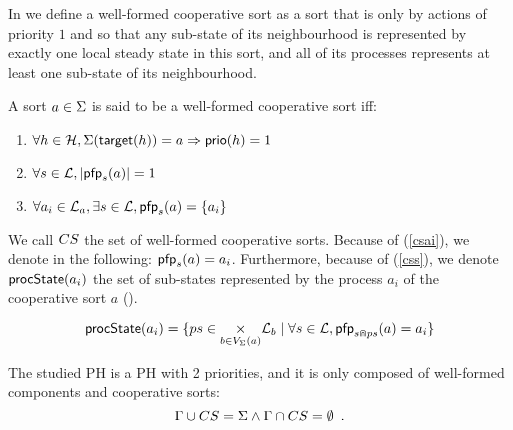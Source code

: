 In  we define a well-formed cooperative sort as a sort that is only by actions of priority $1$ and so that
any sub-state of its neighbourhood is represented by exactly one local steady state in this sort,
and all of its processes represents at least one sub-state of its neighbourhood. 
\begin{definition}
\label{def:cs}
  A sort $a \in \Sigma$ is said to be a well-formed cooperative sort iff:
  \begin{enumerate}
    \item $\forall h \in \mathcal{H}, \Sigma(\mathsf{target}(h)) = a \Rightarrow \mathsf{prio}(h) = 1$
    \item \label{csai} $\forall s \in \mathcal{L}, |\mathsf{pfp}_s(a)| = 1$
    \item \label{css} $\forall a_i \in \mathcal{L}_a, \exists s \in \mathcal{L}, \mathsf{pfp}_s(a) = \{ a_i \}$
  \end{enumerate}
\end{definition}
We call $CS$ the set of well-formed cooperative sorts.
Because of (\ref{csai}), we denote in the following: $\mathsf{pfp}_s(a) = a_i$.
Furthermore, because of (\ref{css}), we denote $\mathsf{procState}(a_i)$ the set of sub-states represented by the process $a_i$ of the cooperative sort $a$ ().
\begin{definition}
\label{def:csState}
  $$\mathsf{procState}(a_i) = \{ ps \in \underset{b \in V_\Sigma(a)}{\times} \mathcal{L}_b \mid \forall s \in \mathcal{L}, \mathsf{pfp}_{s \Cap ps}(a) = a_i \}$$
\end{definition}

\begin{criterion}
\label{cr:compcs}
  The studied PH is a PH with 2 priorities, and it is only composed of well-formed components and cooperative sorts:
  $$\Gamma \cup CS = \Sigma \wedge \Gamma \cap CS = \emptyset \enspace.$$
\end{criterion}

